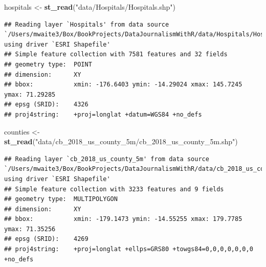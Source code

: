 \documentclass[]{book}
\newenvironment{Shaded}{\begin{snugshade}}{\end{snugshade}}
\newcommand{\KeywordTok}[1]{\textcolor[rgb]{0.13,0.29,0.53}{\textbf{#1}}}
\newcommand{\NormalTok}[1]{#1}
\newcommand{\OperatorTok}[1]{\textcolor[rgb]{0.81,0.36,0.00}{\textbf{#1}}}
\newcommand{\StringTok}[1]{\textcolor[rgb]{0.31,0.60,0.02}{#1}}
\begin{document}
\begin{Shaded}
\begin{Highlighting}[]
\NormalTok{hospitals <-}\StringTok{ }\KeywordTok{st_read}\NormalTok{(}\StringTok{"data/Hospitals/Hospitals.shp"}\NormalTok{)}
\end{Highlighting}
\end{Shaded}

\begin{verbatim}
## Reading layer `Hospitals' from data source `/Users/mwaite3/Box/BookProjects/DataJournalismWithR/data/Hospitals/Hospitals.shp' using driver `ESRI Shapefile'
## Simple feature collection with 7581 features and 32 fields
## geometry type:  POINT
## dimension:      XY
## bbox:           xmin: -176.6403 ymin: -14.29024 xmax: 145.7245 ymax: 71.29285
## epsg (SRID):    4326
## proj4string:    +proj=longlat +datum=WGS84 +no_defs
\end{verbatim}

\begin{Shaded}
\end{Shaded}

\begin{Shaded}
\end{Shaded}

\begin{Shaded}
\begin{Highlighting}[]
\NormalTok{counties <-}\StringTok{ }\KeywordTok{st_read}\NormalTok{(}\StringTok{"data/cb_2018_us_county_5m/cb_2018_us_county_5m.shp"}\NormalTok{)}
\end{Highlighting}
\end{Shaded}

\begin{verbatim}
## Reading layer `cb_2018_us_county_5m' from data source `/Users/mwaite3/Box/BookProjects/DataJournalismWithR/data/cb_2018_us_county_5m/cb_2018_us_county_5m.shp' using driver `ESRI Shapefile'
## Simple feature collection with 3233 features and 9 fields
## geometry type:  MULTIPOLYGON
## dimension:      XY
## bbox:           xmin: -179.1473 ymin: -14.55255 xmax: 179.7785 ymax: 71.35256
## epsg (SRID):    4269
## proj4string:    +proj=longlat +ellps=GRS80 +towgs84=0,0,0,0,0,0,0 +no_defs
\end{verbatim}
\end{document}
